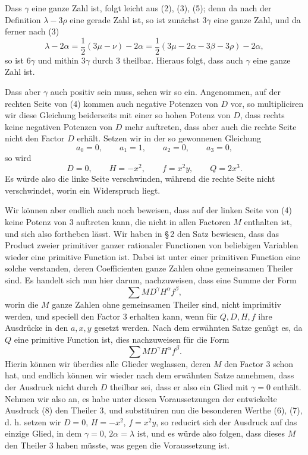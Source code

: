 \documentclass[11pt]{article}
\begin{document}
Dass $\gamma$ eine ganze Zahl ist, folgt leicht aus (2), (3), (5); denn da nach der Definition $\lambda-3\rho$ eine gerade Zahl ist, so ist zunächst $3\gamma$ eine ganze Zahl, und da ferner nach (3)
\[
 \lambda-2\alpha=\frac12(3\mu-\nu)-2\alpha
 =\frac12(3\mu-2\alpha-3\beta-3\rho)-2\alpha,
\]
so ist $6\gamma$ und mithin $3\gamma$ durch $3$ theilbar. Hieraus folgt, dass auch $\gamma$ eine ganze Zahl ist.

Dass aber $\gamma$ auch positiv sein muss, sehen wir so ein. Angenommen, auf der rechten Seite von (4) kommen auch negative Potenzen von $D$ vor, so multipliciren wir diese Gleichung beiderseits mit einer so hohen Potenz von $D$, dass rechts keine negativen Potenzen von $D$ mehr auftreten, dass aber auch die rechte Seite nicht den Factor $D$ erhält. Setzen wir in der so gewonnenen Gleichung
\begin{equation}
 a_0=0,
 \qquad a_1=1,
 \qquad a_2=0,
 \qquad a_3=0,
\tag{6}
\end{equation}
so wird
\begin{equation}
 D=0,
 \qquad H=-x^2,
 \qquad f=x^2y,
 \qquad Q=2x^3.
\tag{7}
\end{equation}
Es würde also die linke Seite verschwinden, während die rechte Seite nicht verschwindet, worin ein Widerspruch liegt.

Wir können aber endlich auch noch beweisen, dass auf der linken Seite von (4) keine Potenz von $3$ auftreten kann, die nicht in allen Factoren $M$ enthalten ist, und sich also fortheben lässt. Wir haben in \S\,2 den Satz bewiesen, dass das Product zweier primitiver ganzer rationaler Functionen von beliebigen Variablen wieder eine primitive Function ist. Dabei ist unter einer primitiven Function eine solche verstanden, deren Coefficienten ganze Zahlen ohne gemeinsamen Theiler sind. Es handelt sich nun hier darum, nachzuweisen, dass eine Summe der Form
\[
 \sum M D^\gamma H^\alpha f^\beta,
\]
worin die $M$ ganze Zahlen ohne gemeinsamen Theiler sind, nicht imprimitiv werden, und speciell den Factor $3$ erhalten kann, wenn für $Q,D,H,f$ ihre Ausdrücke in den $a,x,y$ gesetzt werden. Nach dem erwähnten Satze genügt es, da $Q$ eine primitive Function ist, dies nachzuweisen für die Form
\begin{equation}
 \sum M D^\gamma H^\alpha f^\beta.
\tag{8}
\end{equation}
Hierin können wir überdies alle Glieder weglassen, deren $M$ den Factor $3$ schon hat, und endlich können wir wieder nach dem erwähnten Satze annehmen, dass der Ausdruck nicht durch $D$ theilbar sei, dass er also ein Glied mit $\gamma=0$ enthält. Nehmen wir also an, es habe unter diesen Voraussetzungen der entwickelte Ausdruck (8) den Theiler $3$, und substituiren nun die besonderen Werthe (6), (7), d. h. setzen wir $D=0$, $H=-x^2$, $f=x^2y$, so reducirt sich der Ausdruck auf das einzige Glied, in dem $\gamma=0$, $2\alpha=\lambda$ ist, und es würde also folgen, dass dieses $M$ den Theiler $3$ haben müsste, was gegen die Voraussetzung ist.
\end{document}
